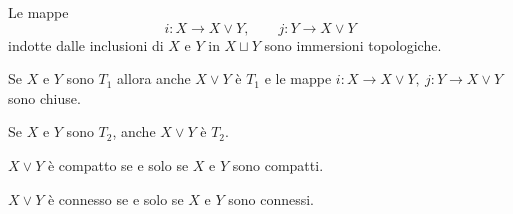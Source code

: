 \begin{multicols*}{2}
\begin{proposition}\label{FattoriSiImmergonoInBouquetWedge}
Le mappe
\[i:X\to X\vee Y,\qquad j:Y\to X\vee Y\]
indotte dalle inclusioni di $X$ e $Y$ in $X\sqcup Y$ sono immersioni topologiche.
\end{proposition}

\begin{proposition}\label{T1PassaAlBouquetWedgeEImmersioniChiuse}
Se $X$ e $Y$ sono $T_1$ allora anche $X\vee Y$ \`e $T_1$ e le mappe $i:X\to X\vee Y,\ j:Y\to X\vee Y$ sono chiuse.
\end{proposition}

\begin{proposition}\label{T2PassaAlBouquetWedge}
Se $X$ e $Y$ sono $T_2$, anche $X\vee Y$ \`e $T_2$.
\end{proposition}

\begin{proposition}\label{BouquetWedgeECompattoSeESoloSeFattoriCompatti}
$X\vee Y$ \`e compatto se e solo se $X$ e $Y$ sono compatti.
\end{proposition}

\begin{proposition}\label{BouquetEConnessoSeESoloSeLoSonoIFattori}
$X\vee Y$ \`e connesso se e solo se $X$ e $Y$ sono connessi.
\end{proposition}





\end{multicols*}
